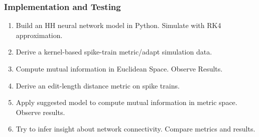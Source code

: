 \documentclass[12pt]{extarticle}
\begin{document}
\subsubsection*{Implementation and Testing}
\begin{enumerate}
\item Build an HH neural network model in Python. Simulate with RK4 approximation.
\item Derive a kernel-based spike-train metric/adapt simulation data.
\item Compute mutual information in Euclidean Space. Observe Results.
\item Derive an edit-length distance metric on spike trains.
\item Apply suggested model to compute mutual information in metric space. Observe results.
\item Try to infer insight about network connectivity. Compare metrics and results.
\end{enumerate}
\end{document}
